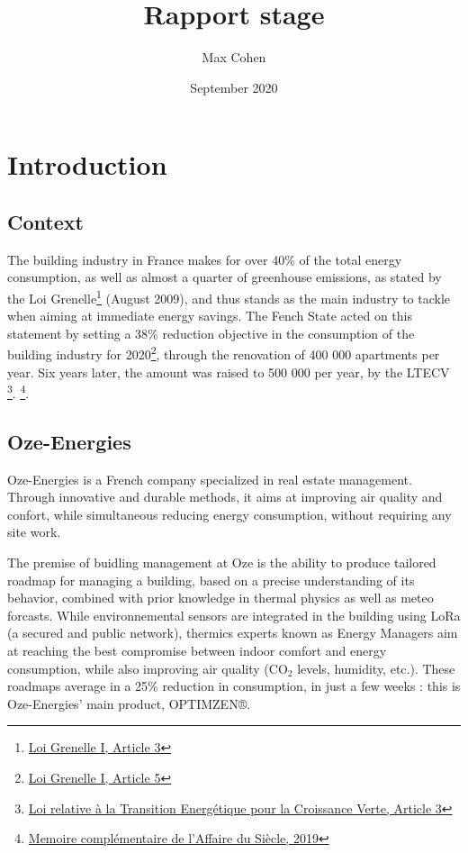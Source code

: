 \documentclass[12pt]{article}
\title{Rapport stage}
\author{Max Cohen}
\date{September 2020}
\begin{document}
\begin{titlepage}
    \maketitle
\end{titlepage}

\tableofcontents

\section{Introduction}

\subsection{Context}
The building industry in France makes for over 40\% of the total energy consumption, as well as almost a quarter of greenhouse emissions, as stated by the Loi Grenelle\footnote{\href{https://www.legifrance.gouv.fr/loda/id/JORFTEXT000020949548/2020-09-21/}{Loi Grenelle I, Article 3}} (August 2009), and thus stands as the main industry to tackle when aiming at immediate energy savings. The Fench State acted on this statement by setting a 38\% reduction objective in the consumption of the building industry for 2020\footnote{\href{https://www.legifrance.gouv.fr/loda/id/JORFTEXT000020949548/2020-09-21/}{Loi Grenelle I, Article 5}}, through the renovation of 400 000 apartments per year. Six years later, the amount was raised to 500 000 per year, by the LTECV \footnote{\href{https://www.legifrance.gouv.fr/jorf/id/JORFTEXT000031044385/}{Loi relative à la Transition Energétique pour la Croissance Verte, Article 3}}.
\footnote{\href{https://laffairedusiecle.net/argumentaire-memoire-complementaire/}{Memoire complémentaire de l'Affaire du Siècle, 2019}}.

\subsection{Oze-Energies}

Oze-Energies is a French company specialized in real estate management. Through innovative and durable methods, it aims at improving air quality and confort, while simultaneous reducing energy consumption, without requiring any site work.

The premise of buidling management at Oze is the ability to produce tailored roadmap for managing a building, based on a precise understanding of its behavior, combined with prior knowledge in thermal physics as well as meteo forcasts. While environnemental sensors are integrated in the building using LoRa (a secured and public network), thermics experts known as Energy Managers aim at reaching the best compromise between indoor comfort and energy consumption, while also improving air quality (\ensuremath{\mathrm{CO_2}} levels, humidity, etc.). These roadmaps average in a 25\% reduction in consumption, in just a few weeks : this is Oze-Energies' main product, OPTIMZEN®.
\end{document}
